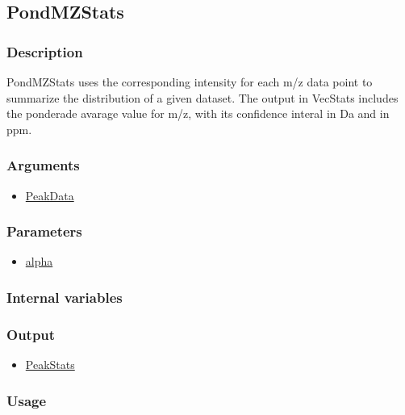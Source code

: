 \subsection{PondMZStats}\label{PondMZStats}
\subsubsection{Description}
PondMZStats uses the corresponding intensity for each m/z data point to summarize the distribution of a given dataset. The output in VecStats includes the ponderade avarage value for m/z, with its confidence interal in Da and in ppm.
\subsubsection{Arguments}
\begin{itemize}
\item \hyperref[PeakData]{PeakData}
\end{itemize}
\subsubsection{Parameters}
\begin{itemize}
\item \hyperref[alpha]{alpha}
\end{itemize}
\subsubsection{Internal variables}
\subsubsection{Output}
\begin{itemize}
\item \hyperref[PeakStats]{PeakStats}
\end{itemize}
\subsubsection{Usage}

